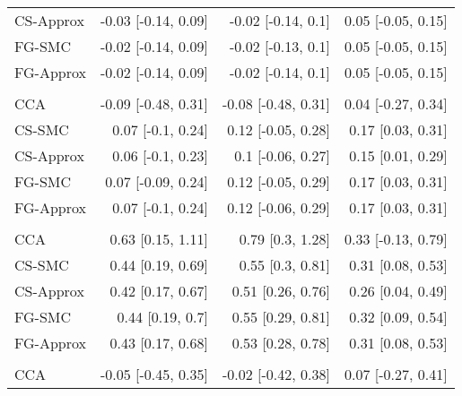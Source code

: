 \documentclass[
  12pt,
  a4paper,
]{article}
\begin{document}
\begin{longtable}[t]{lrrr}
\hspace{1em}CS-Approx & -0.03 [-0.14, 0.09] & -0.02 [-0.14, 0.1] & 0.05 [-0.05, 0.15]\\
\hspace{1em}FG-SMC & -0.02 [-0.14, 0.09] & -0.02 [-0.13, 0.1] & 0.05 [-0.05, 0.15]\\
\hspace{1em}FG-Approx & -0.02 [-0.14, 0.09] & -0.02 [-0.14, 0.1] & 0.05 [-0.05, 0.15]\\
\addlinespace[0.3em]
\multicolumn{4}{l}{\textbf{Karnofsky ($80$)}}\\
\hspace{1em}CCA & -0.09 [-0.48, 0.31] & -0.08 [-0.48, 0.31] & 0.04 [-0.27, 0.34]\\
\hspace{1em}CS-SMC & 0.07 [-0.1, 0.24] & 0.12 [-0.05, 0.28] & 0.17 [0.03, 0.31]\\
\hspace{1em}CS-Approx & 0.06 [-0.1, 0.23] & 0.1 [-0.06, 0.27] & 0.15 [0.01, 0.29]\\
\hspace{1em}FG-SMC & 0.07 [-0.09, 0.24] & 0.12 [-0.05, 0.29] & 0.17 [0.03, 0.31]\\
\hspace{1em}FG-Approx & 0.07 [-0.1, 0.24] & 0.12 [-0.06, 0.29] & 0.17 [0.03, 0.31]\\
\addlinespace[0.3em]
\multicolumn{4}{l}{\textbf{Karnofsky ($\leq 70$)}}\\
\hspace{1em}CCA & 0.63 [0.15, 1.11] & 0.79 [0.3, 1.28] & 0.33 [-0.13, 0.79]\\
\hspace{1em}CS-SMC & 0.44 [0.19, 0.69] & 0.55 [0.3, 0.81] & 0.31 [0.08, 0.53]\\
\hspace{1em}CS-Approx & 0.42 [0.17, 0.67] & 0.51 [0.26, 0.76] & 0.26 [0.04, 0.49]\\
\hspace{1em}FG-SMC & 0.44 [0.19, 0.7] & 0.55 [0.29, 0.81] & 0.32 [0.09, 0.54]\\
\hspace{1em}FG-Approx & 0.43 [0.17, 0.68] & 0.53 [0.28, 0.78] & 0.31 [0.08, 0.53]\\
\addlinespace[0.3em]
\multicolumn{4}{l}{\textbf{Disease subclassification: secondary MF}}\\
\hspace{1em}CCA & -0.05 [-0.45, 0.35] & -0.02 [-0.42, 0.38] & 0.07 [-0.27, 0.41]\\

\end{longtable}
\end{document}
